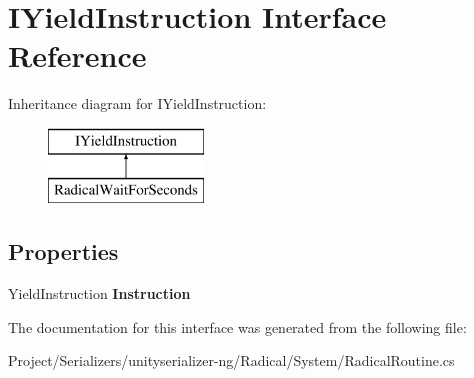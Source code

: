 \hypertarget{interface_i_yield_instruction}{}\section{I\+Yield\+Instruction Interface Reference}
\label{interface_i_yield_instruction}
Inheritance diagram for I\+Yield\+Instruction\+:\begin{figure}[H]
\begin{center}
\leavevmode
\includegraphics[height=2.000000cm]{interface_i_yield_instruction}
\end{center}
\end{figure}
\subsection*{Properties}
\begin{DoxyCompactItemize}
\item 
\mbox{\label{interface_i_yield_instruction_a15d4e90ac68d12f7d6ca04df401dd403}} 
Yield\+Instruction {\bfseries Instruction}
\end{DoxyCompactItemize}


The documentation for this interface was generated from the following file\+:\begin{DoxyCompactItemize}
\item 
Project/\+Serializers/unityserializer-\/ng/\+Radical/\+System/Radical\+Routine.\+cs\end{DoxyCompactItemize}

